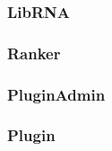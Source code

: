   \subsubsection{LibRNA}
  \subsubsection{Ranker}
  \subsubsection{PluginAdmin}
  \subsubsection{Plugin}